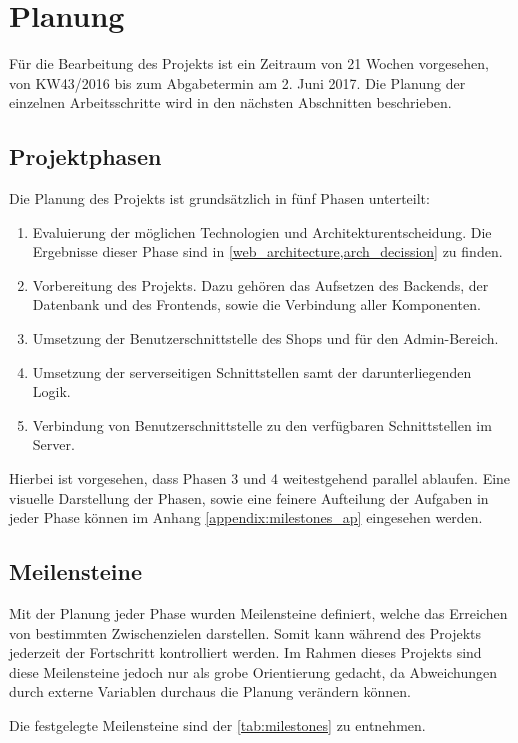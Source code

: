 \section{Planung} \thispagestyle{nomarkstyle}
Für die Bearbeitung des Projekts ist ein Zeitraum von 21 Wochen vorgesehen, von KW43/2016 bis zum Abgabetermin am 2. Juni 2017.
Die Planung der einzelnen Arbeitsschritte wird in den nächsten Abschnitten beschrieben.

\subsection{Projektphasen}
Die Planung des Projekts ist grundsätzlich in fünf Phasen unterteilt:
\begin{enumerate}
	\item Evaluierung der möglichen Technologien und Architekturentscheidung. Die Ergebnisse dieser Phase sind in \cref{web_architecture,arch_decission} zu finden.
	\item Vorbereitung des Projekts. Dazu gehören das Aufsetzen des Backends, der Datenbank und des Frontends, sowie die Verbindung aller Komponenten.
	\item Umsetzung der Benutzerschnittstelle des Shops und für den Admin-Bereich.
	\item Umsetzung der serverseitigen Schnittstellen samt der darunterliegenden Logik.
	\item Verbindung von Benutzerschnittstelle zu den verfügbaren Schnittstellen im Server.
\end{enumerate}

Hierbei ist vorgesehen, dass Phasen 3 und 4 weitestgehend parallel ablaufen. Eine visuelle Darstellung der Phasen, sowie eine feinere Aufteilung der Aufgaben in jeder Phase können im Anhang \ref{appendix:milestones_ap} eingesehen werden.

\subsection{Meilensteine}
Mit der Planung jeder Phase wurden Meilensteine definiert, welche das Erreichen von bestimmten Zwischenzielen darstellen. Somit kann während des Projekts jederzeit der Fortschritt kontrolliert werden.
Im Rahmen dieses Projekts sind diese Meilensteine jedoch nur als grobe Orientierung gedacht, da Abweichungen durch externe Variablen durchaus die Planung verändern können.

Die festgelegte Meilensteine sind der \cref{tab:milestones} zu entnehmen.

